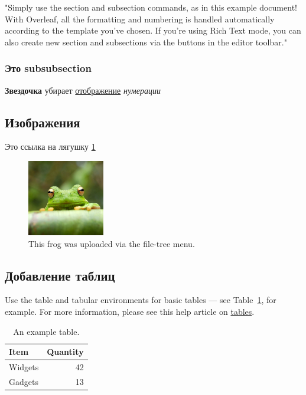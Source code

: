 \documentclass{article}
\begin{document}
"Simply use the section and subsection commands, as in this example document! With Overleaf, all the formatting and numbering is handled automatically according to the template you've chosen. If you're using Rich Text mode, you can also create new section and subsections via the buttons in the editor toolbar."

\subsubsection*{Это subsubsection}
\textbf{Звездочка} убирает \underline{отображение} \textit{нумерации}

\subsection{Изображения}

Это ссылка на лягушку \ref{fig:frog}

\begin{figure}
\centering
\includegraphics[width=0.3\textwidth]{frog.jpg}
\caption{\label{fig:frog}This frog was uploaded via the file-tree menu.}
\end{figure}

\subsection{Добавление таблиц}

Use the table and tabular environments for basic tables --- see Table~\ref{tab:widgets}, for example. For more information, please see this help article on \href{https://www.overleaf.com/learn/latex/tables}{tables}. 

\begin{table}
\centering
\begin{tabular}{l|r}
Item & Quantity \\\hline
Widgets & 42 \\
Gadgets & 13
\end{tabular}
\caption{\label{tab:widgets}An example table.}
\end{table}
\end{document}
